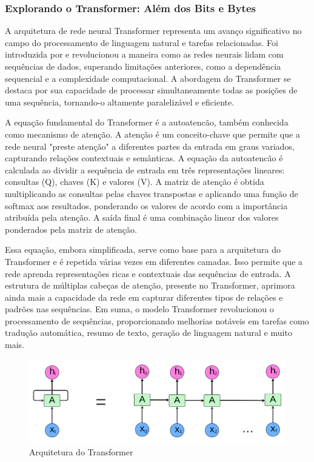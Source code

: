 \subsubsection{Explorando o Transformer: Al\'em dos Bits e Bytes}

A arquitetura de rede neural Transformer representa um avanço significativo no campo do processamento de linguagem natural e tarefas relacionadas. Foi introduzida por  e revolucionou a maneira como as redes neurais lidam com sequências de dados, superando limitações anteriores, como a dependência sequencial e a complexidade computacional. A abordagem do Transformer se destaca por sua capacidade de processar simultaneamente todas as posições de uma sequência, tornando-o altamente paralelizável e eficiente.

A equação fundamental do Transformer é a autoatencão, também conhecida como mecanismo de atenção. A atenção é um conceito-chave que permite que a rede neural "preste atenção" a diferentes partes da entrada em graus variados, capturando relações contextuais e semânticas. A equação da autoatencão é calculada ao dividir a sequência de entrada em três representações lineares: consultas (Q), chaves (K) e valores (V). A matriz de atenção é obtida multiplicando as consultas pelas chaves transpostas e aplicando uma função de softmax aos resultados, ponderando os valores de acordo com a importância atribuída pela atenção. A saída final é uma combinação linear dos valores ponderados pela matriz de atenção.

Essa equação, embora simplificada, serve como base para a arquitetura do Transformer e é repetida várias vezes em diferentes camadas. Isso permite que a rede aprenda representações ricas e contextuais das sequências de entrada. A estrutura de múltiplas cabeças de atenção, presente no Transformer, aprimora ainda mais a capacidade da rede em capturar diferentes tipos de relações e padrões nas sequências. Em suma, o modelo Transformer revolucionou o processamento de sequências, proporcionando melhorias notáveis em tarefas como tradução automática, resumo de texto, geração de linguagem natural e muito mais.

\begin{figure}[!htpb]
	\centering
	\caption{Arquitetura do Transformer}
	\label{fig:transformer}
	\includegraphics[width=1\linewidth]{Apendices/Figuras/modelagem-24h/Transformer}
	
\end{figure}
